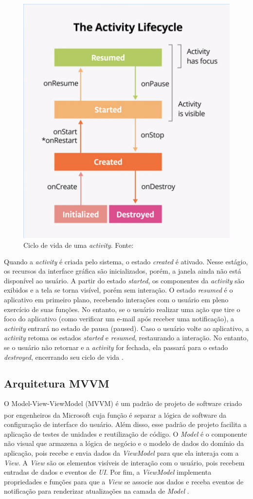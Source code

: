 \begin{figure}[ht]
    \centering
    \includegraphics[width=.37\textwidth]{img/activity-lifecycle.png}
    \caption{Ciclo de vida de uma \textit{activity}. Fonte:\cite{google-developers-activity-lifecycle}}\label{figActivityLifeCycle}
\end{figure}

Quando a \textit{activity} é criada pelo sistema, o estado \textit{created} é ativado. Nesse estágio, os recursos da interface gráfica 
são inicializados, porém, a janela ainda não está disponível ao usuário. A partir do estado \textit{started}, os componentes da \textit{activity} são exibidos e a tela se torna visível, porém sem interação.
O estado \textit{resumed} é o aplicativo em primeiro plano, recebendo interações com o usuário em pleno exercício de suas funções. No entanto, se o usuário realizar uma ação que tire 
o foco do aplicativo (como verificar um e-mail após receber uma notificação), a \textit{activity} entrará no estado de pausa (paused).
Caso o usuário volte ao aplicativo, a \textit{activity} retoma os estados \textit{started} e \textit{resumed}, restaurando a interação. No entanto, se o usuário não retornar e a \textit{activity} for fechada, 
ela passará para o estado \textit{destroyed}, encerrando seu ciclo de vida \cite{google-developers-activity-lifecycle}.

\subsection{Arquitetura MVVM}

O Model-View-ViewModel (MVVM) é um padrão de projeto de software criado por engenheiros da Microsoft\textsuperscript{\textregistered} 
cuja função é separar a lógica de software da configuração de interface do usuário. Além disso, esse padrão de projeto facilita a aplicação de testes de unidades e reutilização 
de código. O \textit{Model} é o componente não visual que armazena a lógica de negócio e o modelo de dados do domínio da aplicação, pois recebe e envia dados da \textit{ViewModel} 
para que ela interaja com a \textit{View}. A \textit{View} são os elementos visíveis de interação com o usuário, pois recebem entradas de dados e eventos de \textit{UI}. Por fim, a
\textit{ViewModel} implementa propriedades e funções para que a \textit{View} se associe aos dados e receba eventos de notificação para renderizar atualizações na camada de \textit{Model} \cite{mvvm-documentation}.

